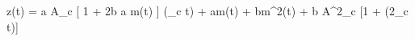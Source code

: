 z(t) = a \cdot A_c [ 1 + {2b \over a} m(t) ] \cdot \cos(\omega_c t) + a\cdot m(t) + b\cdot m^2(t) + {b A^2_c }[1 + \cos(2\omega_c t)]
